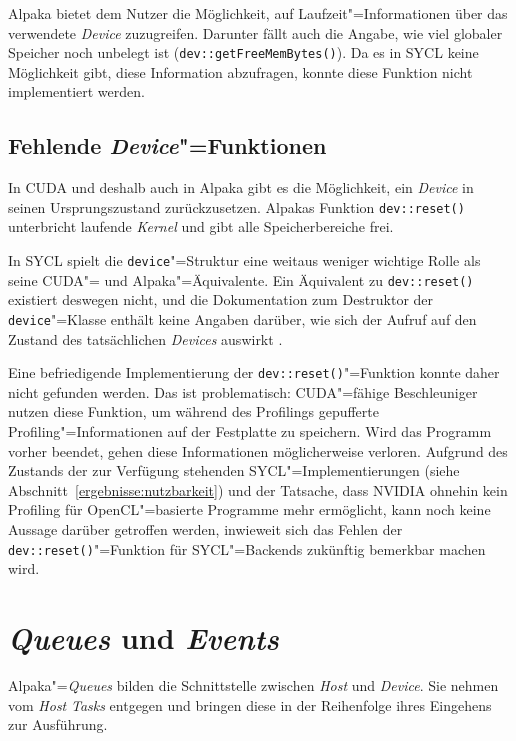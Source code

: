 Alpaka bietet dem Nutzer die Möglichkeit, auf Laufzeit"=Informationen über das
verwendete \textit{Device} zuzugreifen. Darunter fällt auch die Angabe, wie viel
globaler Speicher noch unbelegt ist (\texttt{dev::getFreeMemBytes()}). Da es in
SYCL keine Möglichkeit gibt, diese Information abzufragen, konnte diese Funktion
nicht implementiert werden.

\subsection{Fehlende \textit{Device}"=Funktionen}

In CUDA und deshalb auch in Alpaka gibt es die Möglichkeit, ein \textit{Device}
in seinen Ursprungszustand zurückzusetzen. Alpakas Funktion
\texttt{dev::reset()} unterbricht laufende \textit{Kernel} und gibt alle
Speicherbereiche frei. 

In SYCL spielt die \texttt{device}"=Struktur eine weitaus weniger wichtige
Rolle als seine CUDA"= und Alpaka"=Äquivalente. Ein Äquivalent zu
\texttt{dev::reset()} existiert deswegen nicht, und die Dokumentation zum
Destruktor der \texttt{device}"=Klasse enthält keine Angaben darüber, wie sich
der Aufruf auf den Zustand des tatsächlichen \textit{Devices} auswirkt
\cite[vgl.][33,41,58]{sycl2019}.

Eine befriedigende Implementierung der \texttt{dev::reset()}"=Funktion konnte
daher nicht gefunden werden. Das ist problematisch: CUDA"=fähige Beschleuniger
nutzen diese Funktion, um während des Profilings gepufferte
Profiling"=Informationen auf der Festplatte zu speichern. Wird das Programm
vorher beendet, gehen diese Informationen möglicherweise verloren. Aufgrund des
Zustands der zur Verfügung stehenden SYCL"=Implementierungen (siehe
Abschnitt~\ref{ergebnisse:nutzbarkeit}) und der Tatsache, dass NVIDIA ohnehin
kein Profiling für OpenCL"=basierte Programme mehr ermöglicht, kann noch keine
Aussage darüber getroffen werden, inwieweit sich das Fehlen der
\texttt{dev::reset()}"=Funktion für SYCL"=Backends zukünftig bemerkbar machen
wird.

\section{\textit{Queues} und \textit{Events}}
\label{implementierung:queue}

Alpaka"=\textit{Queues} bilden die Schnittstelle zwischen \textit{Host} und
\textit{Device}. Sie nehmen vom \textit{Host} \textit{Tasks} entgegen und
bringen diese in der Reihenfolge ihres Eingehens zur Ausführung.

